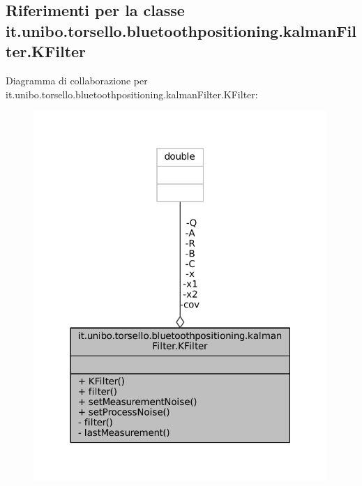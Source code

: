 \hypertarget{classit_1_1unibo_1_1torsello_1_1bluetoothpositioning_1_1kalmanFilter_1_1KFilter}{}\subsection{Riferimenti per la classe it.\+unibo.\+torsello.\+bluetoothpositioning.\+kalman\+Filter.\+K\+Filter}
\label{classit_1_1unibo_1_1torsello_1_1bluetoothpositioning_1_1kalmanFilter_1_1KFilter}


Diagramma di collaborazione per it.\+unibo.\+torsello.\+bluetoothpositioning.\+kalman\+Filter.\+K\+Filter\+:
\nopagebreak
\begin{figure}[H]
\begin{center}
\leavevmode
\includegraphics[width=316pt]{classit_1_1unibo_1_1torsello_1_1bluetoothpositioning_1_1kalmanFilter_1_1KFilter__coll__graph}
\end{center}
\end{figure}
